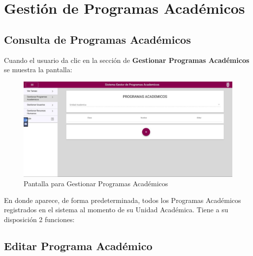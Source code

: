 \section{Gestión de Programas Académicos}
    \subsection{Consulta de Programas Académicos}
        Cuando el usuario da clic en la sección de \textbf{Gestionar Programas Académicos} se muestra la pantalla:
        \begin{figure}[H]
        	\centering
        	\hypertarget{consultarpa}{\includegraphics[width=0.7\linewidth]{images/SP3/ConsultarPA}}
        	\caption{Pantalla para Gestionar Programas Académicos}
        	\label{consultarpa}
        \end{figure}

        En donde aparece, de forma predeterminada, todos los Programas Académicos  registrados en el sistema al momento de su Unidad Académica. Tiene a su disposición 2 funciones:

	    \subsection{Editar Programa Académico}

